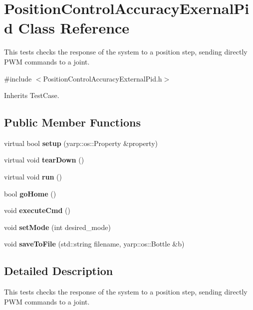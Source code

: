 \section{Position\+Control\+Accuracy\+Exernal\+Pid Class Reference}
\label{classPositionControlAccuracyExernalPid}


This tests checks the response of the system to a position step, sending directly P\+WM commands to a joint.  




{\ttfamily \#include $<$Position\+Control\+Accuracy\+External\+Pid.\+h$>$}



Inherits Test\+Case.

\subsection*{Public Member Functions}
\begin{DoxyCompactItemize}
\item 
\mbox{\label{classPositionControlAccuracyExernalPid_abba945d5c3b4f4e4b5b0bd55f2b9204c}} 
virtual bool {\bfseries setup} (yarp\+::os\+::\+Property \&property)
\item 
\mbox{\label{classPositionControlAccuracyExernalPid_af669d21a9e774f141ff0a4263b1e42a4}} 
virtual void {\bfseries tear\+Down} ()
\item 
\mbox{\label{classPositionControlAccuracyExernalPid_a898e7627acaef71a92f734acc24ef17f}} 
virtual void {\bfseries run} ()
\item 
\mbox{\label{classPositionControlAccuracyExernalPid_aa8d2b518229a4e63aa9f85c6f29d0679}} 
bool {\bfseries go\+Home} ()
\item 
\mbox{\label{classPositionControlAccuracyExernalPid_aa83fe1e3938433dd5315ffa917966873}} 
void {\bfseries execute\+Cmd} ()
\item 
\mbox{\label{classPositionControlAccuracyExernalPid_ab147307ff6b0f3be7bb895b2bed93dd3}} 
void {\bfseries set\+Mode} (int desired\+\_\+mode)
\item 
\mbox{\label{classPositionControlAccuracyExernalPid_af2a2eb5af608353daa6ebb002b06ab8d}} 
void {\bfseries save\+To\+File} (std\+::string filename, yarp\+::os\+::\+Bottle \&b)
\end{DoxyCompactItemize}


\subsection{Detailed Description}
This tests checks the response of the system to a position step, sending directly P\+WM commands to a joint. 

